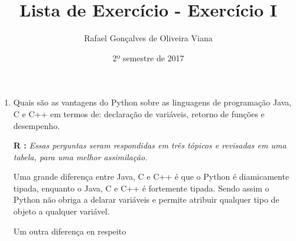 \documentclass[12pt]{article}
\title{Lista de Exercício  - Exercício I }
\author{Rafael Gonçalves de  Oliveira Viana}
\date{2º semestre de 2017}
\begin{document}
\maketitle

\begin{enumerate}
\item
Quais são as vantagens do Python sobre as linguagens de programação Java, C e C++
em termos de: declaração de variáveis, retorno de funções e desempenho.


\textbf{R :}\textit{
	Essas perguntas seram respondidas em três tópicos e revisadas em uma tabela, para uma melhor assimilação.}
	
	 Uma grande diferença entre Java, C e C++ é que o Python é diamicamente tipada, enquanto o Java, C e C++ é fortemente tipada. Sendo assim o Python não obriga a delarar variáveis e permite atribuir qualquer tipo de objeto a qualquer variável.
	 
	 
	 Um outra diferença en respeito
	 
	 
	 
	 

\end{enumerate}
\end{document}
